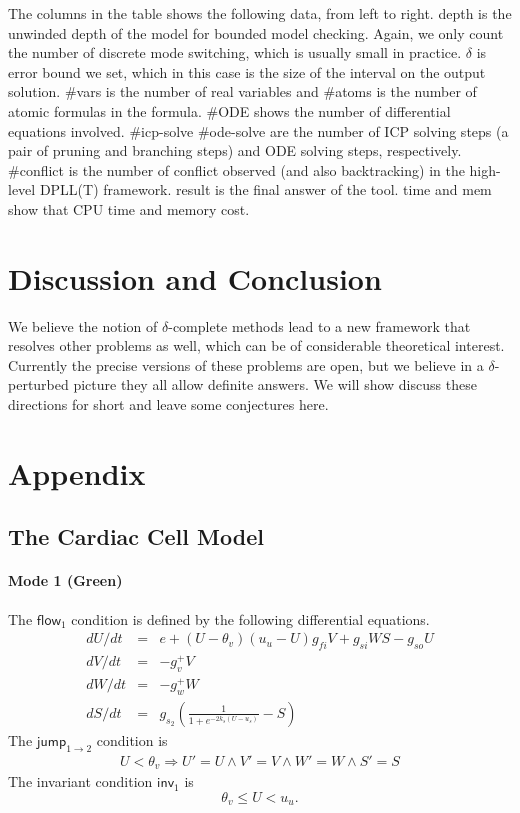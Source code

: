 \documentclass[envcountsect]{llncs}
\newcommand{\flow}{\mathsf{flow}}
\newcommand{\jump}{\mathsf{jump}}
\newcommand{\inv}{\mathsf{inv}}
\begin{document}
The columns in the table shows the following data, from left to right. {\sf
depth} is the unwinded depth of the model for bounded model checking. Again, we
only count the number of discrete mode switching, which is usually small in
practice. {\sf $\delta$} is error bound we set, which in this case is the size
of the interval on the output solution. {\sf \#vars} is the number of real
variables and {\sf \#atoms} is the number of atomic
formulas in the formula. {\sf \#ODE} shows the number of differential equations
involved. \#{\sf icp-solve} \#{ode-solve} are the number of ICP solving steps (a
pair of pruning and branching steps) and ODE solving steps, respectively.
\#{\sf conflict} is the number of conflict observed (and also backtracking) in
the high-level DPLL(T) framework. {result} is the final answer of the tool. {\sf
time} and {\sf mem} show that CPU time and memory cost. 



\section{Discussion and Conclusion}\label{conclude}


We believe the notion of $\delta$-complete methods lead to a new framework that
resolves other problems as well, which can be of considerable theoretical
interest. Currently the precise versions of these problems are open, but we
believe in a $\delta$-perturbed picture they all allow definite answers. We
will show discuss these directions for short and leave some conjectures here.








\newpage
\section*{Appendix}

\subsection*{The Cardiac Cell Model}


\paragraph{Mode 1 (Green)}
The $\flow_1$ condition is defined by the following differential equations.
\begin{eqnarray*}
dU/dt &=& e  + ( U - \theta_v)(u_u - U)g_{fi}V + g_{si}WS-g_{so}U\\
dV/dt &=& -g_v^+ V\\
dW/dt &=& -g_w^+ W\\
dS/dt &=& g_{s_2} (\frac{1}{1+e^{-2k_s(U-u_s)}}- S)
\end{eqnarray*}
The $\jump_{1\rightarrow 2}$ condition is
\begin{eqnarray*}
U < \theta_v \Longrightarrow U' = U \wedge V' = V \wedge W' = W \wedge S' =
S
\end{eqnarray*}
The invariant condition $\inv_1$ is
$$\theta_v \leq U < u_u.$$
\end{document}
